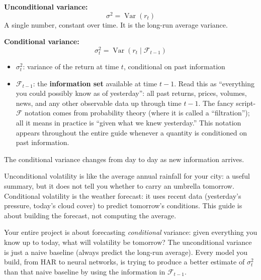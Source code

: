 \begin{definition}
\textbf{Unconditional variance:}
\begin{equation}
  \sigma^2 = \operatorname{Var}(r_t)
  \label{eq:uncond-var}
\end{equation}
A single number, constant over time. It is the long-run average variance.

\textbf{Conditional variance:}
\begin{equation}
  \sigma_t^2 = \operatorname{Var}(r_t \mid \mathcal{F}_{t-1})
  \label{eq:cond-var}
\end{equation}
\begin{itemize}[nosep]
  \item $\sigma_t^2$: variance of the return at time $t$, conditional on past information
  \item $\mathcal{F}_{t-1}$: the \textbf{information set} available at time $t-1$.
  Read this as ``everything you could possibly know as of yesterday'': all past returns, prices, volumes, news, and any other observable data up through time $t-1$.
  The fancy script-$\mathcal{F}$ notation comes from probability theory (where it is called a ``filtration''); all it means in practice is ``given what we knew yesterday.''
  This notation appears throughout the entire guide whenever a quantity is conditioned on past information.
\end{itemize}
The conditional variance changes from day to day as new information arrives.
\end{definition}

\begin{intuition}
Unconditional volatility is like the average annual rainfall for your city: a useful summary, but it does not tell you whether to carry an umbrella tomorrow.
Conditional volatility is the weather forecast: it uses recent data (yesterday's pressure, today's cloud cover) to predict tomorrow's conditions.
This guide is about building the forecast, not computing the average.
\end{intuition}

\begin{projectconnection}
Your entire project is about forecasting \emph{conditional} variance: given everything you know up to today, what will volatility be tomorrow?
The unconditional variance is just a naive baseline (always predict the long-run average).
Every model you build, from HAR to neural networks, is trying to produce a better estimate of $\sigma_t^2$ than that naive baseline by using the information in $\mathcal{F}_{t-1}$.
\end{projectconnection}

